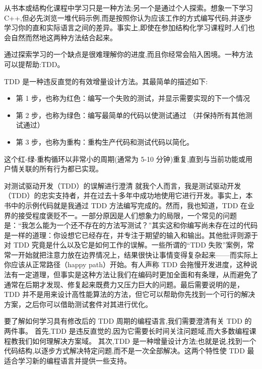 
从书本或结构化课程中学习只是一种方法;另一个是通过个人探索。想象一下学习 C++,但必先浏览一堆代码示例,而是按照你认为应该工作的方式编写代码,并逐步学习你的直和实际语言之间的差异。事实上,即使在参加结构化学习课程时,人们也会自然而然地这两种方法结合起来。

通过探索学习的一个缺点是很难理解你的进度,而且你经常会陷入困境。一种方法可以提帮助:TDD。

TDD 是一种违反直觉的有效增量设计方法。其最简单的描述如下:

\begin{itemize}
\item 
第 1 步，也称为红色：编写一个失败的测试，并显示需要实现的下一个情况

\item 
第 2 步，也称为绿色：编写最简单的代码以使测试通过 （并保持所有其他测试通过）

\item 
第 3 步，也称为重构：重构生产代码和测试代码以简化。
\end{itemize}

这个红-绿-重构循环以非常小的周期(通常为 5-10 分钟)重复,直到与当前功能或用户情关联的所有行为都已实现。

\begin{myTip}{对测试驱动开发（TDD）的误解进行澄清}
就我个人而言，我是测试驱动开发（TDD）的忠实支持者，并在过去十多年中成功地使用它进行开发。事实上，本书中的示例代码就是我通过 TDD 方法编写完成的。然而，我也知道，TDD 在业界的接受程度褒贬不一。一部分原因是人们想象力的局限，一个常见的问题是：“我怎么能为一个还不存在的方法写测试？”其实这和你编写尚未存在过的代码是一样的道理：你设想它已经存在，并专注于期望的输入和输出。其他批评则源于对 TDD 究竟是什么以及它是如何工作的误解。一些所谓的“TDD 失败”案例，常常一开始就把注意力放在边界情况上，结果很快让事情变得复杂起来——而实际上你应该从正常路径（happy path）开始。有人声称 TDD 会拖慢开发进度，这种说法有一定道理，但事实是这种方法让我们在编码时更加全面和有条理，从而避免了通常在后期才发现、修复起来既费力又压力巨大的问题。最后需要说明的是，TDD 并不是用来设计高性能算法的方法，但它可以帮助你先找到一个可行的解决方案，之后你可以借助测试套件对其进行优化。
\end{myTip}

要了解如何学习具有修改后的 TDD 周期的编程语言,我们需要澄清有关 TDD 的两件事。
首先,TDD 是违反直觉的,因为它需要长时间关注问题域,而大多数编程课程教我们如何理解决方案域。 其次,TDD 是一种增量设计方法;也就是说,找到一个代码结构,以逐步方式解决特定问题,而不是一次全部解决。这两个特性使 TDD 最适合学习新的编程语言并提供一些支持。

